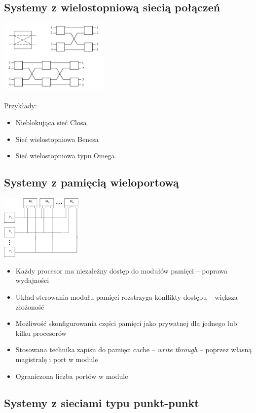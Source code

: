 \documentclass[a4paper,twoside]{article}
\begin{document}
\subsection{Systemy z wielostopniową siecią połączeń}
\includegraphics[width=0.4\textwidth]{./images/wieloproc03}\\\\
Przykłady:
\begin{itemize}
	\item Nieblokująca sieć Closa
	\item Sieć wielostopniowa Benesa
	\item Sieć wielostopniowa typu Omega
\end{itemize}
\subsection{Systemy z pamięcią wieloportową}
\includegraphics[width=0.3\textwidth]{./images/wieloproc04}
\begin{itemize}
	\item Każdy procesor ma niezależny dostęp do modułów pamięci – poprawa wydajności
	\item Układ sterowania modułu pamięci rozstrzyga konflikty dostępu – większa złożoność
	\item Możliwość skonfigurowania części pamięci jako prywatnej dla jednego lub kilku procesorów
	\item Stosowana technika zapisu do pamięci cache – \emph{write through} – poprzez własną magistralę i port w module
	\item Ograniczona liczba portów w module
\end{itemize}
\subsection{Systemy z sieciami typu punkt-punkt}
\end{document}
